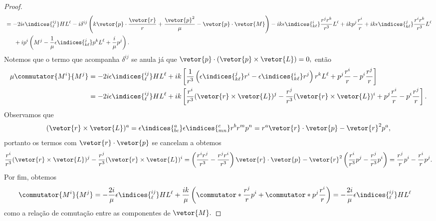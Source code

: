 \begin{proof}
\begin{align*}
                            &=-2i \epsilon\indices{^{ij}_\ell} H L^\ell - i\delta^{ij}\left(k \vetor{p} \cdot \frac{\vetor{r}}{r}  + \frac{\vetor{p}^2}{\mu} - \vetor{p}\cdot\vetor{M}\right) - ik \epsilon\indices{^i_{k \ell}} \frac{r^j r^k}{r^3} L^\ell + ik p^j \frac{r^i}{r}+ ik\epsilon\indices{^j_{k\ell}}\frac{r^i r^k}{r^3}L^\ell\\
                            &{}\phantom{=2}+ i p^i \left(M^j - \frac{1}{\mu}\epsilon\indices{^j_{k\ell}} p^k L^\ell + \frac{i}{\mu} p^j\right).
   \end{align*}
   Notemos que o termo que acompanha \(\delta^{ij}\) se anula já que \(\vetor{p}\cdot(\vetor{p}\times\vetor{L}) = 0,\) então
   \begin{align*}
      \mu \commutator{M^i}{M^j} &= -2i \epsilon\indices{^{ij}_\ell} HL^\ell + ik\left[\frac{1}{r^3} \left(\epsilon\indices{^j_{k\ell}}r^i-\epsilon\indices{^i_{k \ell}} r^j\right)r^k L^\ell + p^j\frac{r^i}{r} - p^i \frac{r^j}{r}\right]\\
                                &= -2i \epsilon\indices{^{ij}_\ell} HL^\ell + ik \left[\frac{r^i}{r^3} (\vetor{r} \times \vetor{L})^j - \frac{r^j}{r^3} (\vetor{r}\times \vetor{L})^i + p^j\frac{r^i}{r} - p^i\frac{r^j}{r}\right].
   \end{align*}
   Observamos que
   \begin{equation*}
      (\vetor{r}\times \vetor{L})^a = \epsilon\indices{^a_{bc}} \epsilon\indices{^c_{mn}} r^b r^m p^n = r^a \vetor{r}\cdot\vetor{p} - \vetor{r}^2 p^a,
   \end{equation*}
   portanto os termos com \(\vetor{r}\cdot\vetor{p}\) se cancelam a obtemos
   \begin{equation*}
      \frac{r^i}{r^3} (\vetor{r}\times \vetor{L})^j - \frac{r^j}{r^3} (\vetor{r} \times \vetor{L})^i = \left(\frac{r^ir^j}{r^3} - \frac{r^jr^i}{r^3}\right)\vetor{r}\cdot\vetor{p} - \vetor{r}^2\left(\frac{r^i}{r^3}p^j - \frac{r^j}{r^3} p^i\right) = \frac{r^j}{r} p^i - \frac{r^i}{r}p^j.
   \end{equation*}
   Por fim, obtemos
   \begin{align*}
      \commutator{M^i}{M^j} &= -\frac{2i}{\mu} \epsilon\indices{^{ij}_\ell} HL^\ell + \frac{ik}{\mu}\left(\commutator*{\frac{r^j}{r}}{p^i} + \commutator*{p^j}{\frac{r^i}{r}}\right) = -\frac{2i}{\mu} \epsilon\indices{^{ij}_\ell} HL^\ell
   \end{align*}
   como a relação de comutação entre as componentes de \(\vetor{M}.\)
\end{proof}

